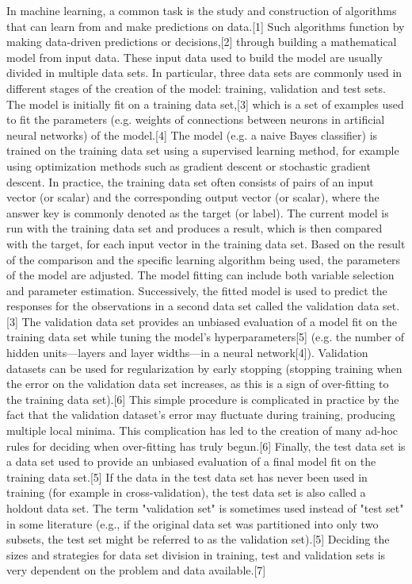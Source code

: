 In machine learning, a common task is the study and construction of algorithms that can learn from and make predictions on data.[1] Such algorithms function by making data-driven predictions or decisions,[2] through building a mathematical model from input data. These input data used to build the model are usually divided in multiple data sets. In particular, three data sets are commonly used in different stages of the creation of the model: training, validation and test sets.
The model is initially fit on a training data set,[3] which is a set of examples used to fit the parameters (e.g. weights of connections between neurons in artificial neural networks) of the model.[4] The model (e.g. a naive Bayes classifier) is trained on the training data set using a supervised learning method, for example using optimization methods such as gradient descent or stochastic gradient descent. In practice, the training data set often consists of pairs of an input vector (or scalar) and the corresponding output vector (or scalar), where the answer key is commonly denoted as the target (or label). The current model is run with the training data set and produces a result, which is then compared with the target, for each input vector in the training data set. Based on the result of the comparison and the specific learning algorithm being used, the parameters of the model are adjusted. The model fitting can include both variable selection and parameter estimation.
Successively, the fitted model is used to predict the responses for the observations in a second data set called the validation data set.[3] The validation data set provides an unbiased evaluation of a model fit on the training data set while tuning the model's hyperparameters[5] (e.g. the number of hidden units—layers and layer widths—in a neural network[4]). Validation datasets can be used for regularization by early stopping (stopping training when the error on the validation data set increases, as this is a sign of over-fitting to the training data set).[6] This simple procedure is complicated in practice by the fact that the validation dataset's error may fluctuate during training, producing multiple local minima. This complication has led to the creation of many ad-hoc rules for deciding when over-fitting has truly begun.[6]
Finally, the test data set is a data set used to provide an unbiased evaluation of a final model fit on the training data set.[5] If the data in the test data set has never been used in training (for example in cross-validation), the test data set is also called a holdout data set. The term "validation set" is sometimes used instead of "test set" in some literature (e.g., if the original data set was partitioned into only two subsets, the test set might be referred to as the validation set).[5]
Deciding the sizes and strategies for data set division in training, test and validation sets is very dependent on the problem and data available.[7]

